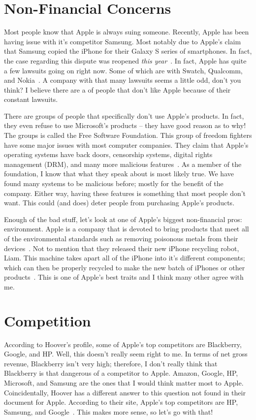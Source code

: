 \documentclass[12pt,a4paper,titlepage]{article}
\begin{document}
\newpage

\section{Non-Financial Concerns}
Most people know that Apple is always suing someone. Recently, Apple has been
having issue with it's competitor Samsung. Most notably due to Apple's claim
that Samsung copied the iPhone for their Galaxy S series of smartphones. In
fact, the case regarding this dispute was reopened \emph{this
  year}~\cite{sue}. In fact, Apple has quite a few lawsuits going on right
now. Some of which are with Swatch, Qualcomm, and Nokia~\cite{insider}. A
company with that many lawsuits seems a little odd, don't you think? I believe
there are a of people that don't like Apple because of their constant
lawsuits.

There are groups of people that specifically don't use Apple's products. In
fact, they even refuse to use Microsoft's products -- they have good reason as
to why! The groups is called the Free Software Foundation. This group of freedom
fighters have some major issues with most computer companies. They claim that
Apple's operating systems have back doors, censorship systems, digital rights
management (DRM), and many more malicious features~\cite{gnu}. As a member of
the foundation, I know that what they speak about is most likely true. We have
found many systems to be malicious before; mostly for the benefit of the
company. Either way, having these features is something that most people don't
want. This could (and does) deter people from purchasing Apple's products.

Enough of the bad stuff, let's look at one of Apple's biggest non-financial
pros: environment. Apple is a company that is devoted to bring products that
meet all of the environmental standards such as removing poisonous metals from
their devices~\cite{apple-green}. Not to mention that they released their new
iPhone recycling robot, Liam. This machine takes apart all of the iPhone into
it's different components; which can then be properly recycled to make the new
batch of iPhones or other products~\cite{apple-green}. This is one of Apple's
best traits and I think many other agree with me.

\newpage

\section{Competition}
According to Hoover's profile, some of Apple's top competitors are Blackberry,
Google, and HP. Well, this doesn't really seem right to me. In terms of net
gross revenue, Blackberry isn't very high; therefore, I don't really think that
Blackberry is that dangerous of a competitor to Apple. Amazon, Google, HP,
Microsoft, and Samsung are the ones that I would think matter most to
Apple. Coincidentally, Hoover has a different answer to this question not found
in their document for Apple. According to their site, Apple's top competitors
are HP, Samsung, and Google~\cite{hoover-com}. This makes more sense, so let's
go with that!
\end{document}
